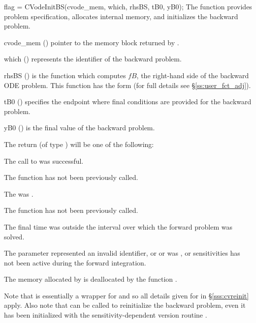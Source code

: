 {
  flag = CVodeInitBS(cvode\_mem, which, rhsBS, tB0, yB0);
}
{
  The function  provides problem specification, allocates internal memory, 
  and initializes the backward problem.
}
{
  \begin{args}
  \item[cvode\_mem] ()
    pointer to the {\cvodes} memory block returned by .
  \item[which] ()
    represents the identifier of the backward problem.
  \item[rhsBS] ()
    is the {\C} function which computes $fB$, the right-hand side of the 
    backward ODE problem. This function has the form 
    (for full details see \S\ref{ss:user_fct_adj}).
  \item[tB0] ()
    specifies the endpoint where final conditions are provided for the 
    backward problem.
  \item[yB0] ()
    is the final value of the backward problem. 
  \end{args}
}
{
  The return  (of type ) will be one of the following:
  \begin{args}
  \item[\Id{CV\_SUCCESS}]
    The call to  was successful.
  \item[\Id{CV\_NO\_MALLOC}]
    The function  has not been previously called.
  \item[\Id{CV\_MEM\_NULL}]
    The  was .
  \item[\Id{CV\_NO\_ADJ}]
    The function  has not been previously called.
  \item[\Id{CV\_BAD\_TB0}]
    The final time  was outside the interval over which the forward problem
    was solved.
  \item[\Id{CV\_ILL\_INPUT}]
    The parameter  represented an invalid identifier, 
    or  or  was ,
    or sensitivities has not been active during the forward integration.
  \end{args}
}
{
  The memory allocated by  is deallocated by the function 
  .  
}

Note that  is essentially a wrapper for 
and so all details given for  in \S\ref{sss:cvreinit}
apply. Also note that  can be called to reinitialize
the backward problem, even it has been initialized with the sensitivity-dependent version
routine .

